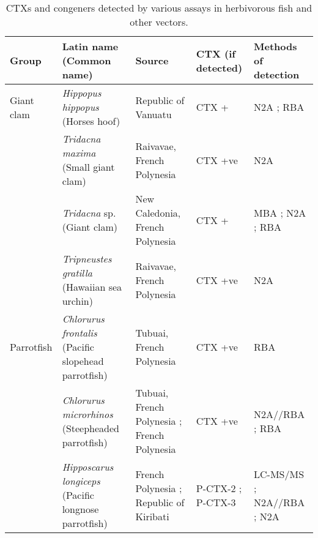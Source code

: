 \documentclass[12pt]{article}
\begin{document}



\FloatBarrier
\begin{longtable}[l]{ | p{2cm} | p{3cm} | p{4.5cm} | p{2cm} | p{3cm} | }
	\caption{CTXs and congeners detected by various assays in herbivorous fish and other vectors.}\\
	\hline
	\label{tbl:HerbTable}
	\textbf{Group} & \textbf{Latin name} (Common name) & \textbf{Source} & \textbf{CTX (if detected)} & \textbf{Methods of detection} \\
	\hline
	Giant clam 	& \emph{Hippopus hippopus} (Horses hoof) & Republic of Vanuatu \cite{laurent2012ciguatera} & CTX +\cite{laurent2012ciguatera} & N2A \cite{laurent2012ciguatera}; RBA \cite{laurent2012ciguatera} \\
	& \emph{Tridacna maxima} (Small giant clam) & Raivavae, French Polynesia \cite{pawlowiez2013evaluation} & CTX +ve\cite{pawlowiez2013evaluation} & N2A \cite{pawlowiez2013evaluation} \\
	& \emph{Tridacna} sp. (Giant clam) & New Caledonia, French Polynesia \cite{laurent2012ciguatera} & CTX +\cite{laurent2012ciguatera} & MBA \cite{laurent2012ciguatera}; N2A \cite{laurent2012ciguatera}; RBA \cite{laurent2012ciguatera} \\
	& \emph{Tripneustes gratilla} (Hawaiian sea urchin) & Raivavae, French Polynesia \cite{pawlowiez2013evaluation} & CTX +ve\cite{pawlowiez2013evaluation} & N2A \cite{pawlowiez2013evaluation} \\
	\hline
	Parrotfish & \emph{Chlorurus frontalis} (Pacific slopehead parrotfish) & Tubuai, French Polynesia \cite{darius2007ciguatera} & CTX +ve \cite{darius2007ciguatera} & RBA \cite{darius2007ciguatera} \\
	& \emph{Chlorurus microrhinos} (Steepheaded parrotfish) & Tubuai, French Polynesia \cite{darius2007ciguatera}; French Polynesia \cite{chinain2014mail} & CTX +ve \cite{darius2007ciguatera,chinain2014mail} & N2A//RBA \cite{chinain2014mail}; RBA \cite{darius2007ciguatera} \\
	& \emph{Hipposcarus longiceps} (Pacific longnose parrotfish) & French Polynesia \cite{chinain2014mail}; Republic of Kiribati \cite{mak2013pacific} & P-CTX-2 \cite{mak2013pacific}; P-CTX-3 \cite{mak2013pacific} & LC-MS/MS \cite{mak2013pacific}; N2A//RBA \cite{chinain2014mail}; N2A \cite{mak2013pacific} \\

\end{longtable}
\end{document}
